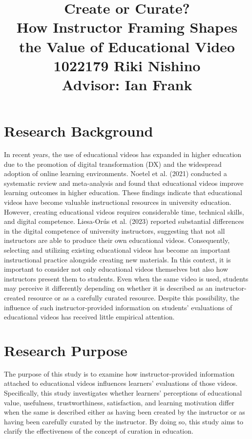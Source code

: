 \documentclass[a4paper,11pt]{article}
\title{Create or Curate?\\ How Instructor Framing Shapes the Value of Educational Video\\
\large  1022179 Riki Nishino\\
Advisor: Ian Frank}
\author{}
\date{}
\begin{document}
\maketitle

\section{Research Background}

In recent years, the use of educational videos has expanded in higher education due to the promotion of digital transformation (DX) and the widespread adoption of online learning environments. Noetel et al. (2021) conducted a systematic review and meta-analysis and found that educational videos improve learning outcomes in higher education. These findings indicate that educational videos have become valuable instructional resources in university education.
However, creating educational videos requires considerable time, technical skills, and digital competence. Liesa-Orús et al. (2023) reported substantial differences in the digital competence of university instructors, suggesting that not all instructors are able to produce their own educational videos. Consequently, selecting and utilizing existing educational videos has become an important instructional practice alongside creating new materials.
In this context, it is important to consider not only educational videos themselves but also how instructors present them to students. Even when the same video is used, students may perceive it differently depending on whether it is described as an instructor-created resource or as a carefully curated resource. Despite this possibility, the influence of such instructor-provided information on students' evaluations of educational videos has received little empirical attention.

\section{Research Purpose}

The purpose of this study is to examine how instructor-provided information attached to educational videos influences learners' evaluations of those videos.
Specifically, this study investigates whether learners' perceptions of educational value, usefulness, trustworthiness, satisfaction, and learning motivation differ when the same  is described either as having been created by the instructor or as having been carefully curated by the instructor.
By doing so, this study aims to clarify the effectiveness of the concept of curation in education.
\end{document}
